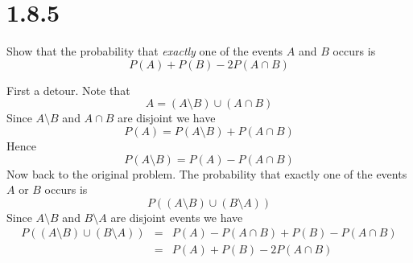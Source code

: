 \section*{1.8.5}
Show that the probability that {\it exactly} one of the events
$A$ and $B$ occurs is
$$P(A)+P(B)-2P(A\cap B)$$

\bigskip
\noindent
First a detour. Note that
$$A=(A\setminus B)\cup(A\cap B)$$
Since $A\setminus B$ and $A\cap B$ are disjoint we have
$$P(A)=P(A\setminus B)+P(A\cap B)$$
Hence
$$P(A\setminus B)=P(A)-P(A\cap B)$$
Now back to the original problem.
The probability that exactly one of the events $A$ or $B$ occurs is
$$P((A\setminus B)\cup(B\setminus A))$$
Since $A\setminus B$ and $B\setminus A$ are disjoint events we have
\begin{eqnarray*}
P((A\setminus B)\cup(B\setminus A))&=&
P(A)-P(A\cap B)+P(B)-P(A\cap B)\\
&=&P(A)+P(B)-2P(A\cap B)
\end{eqnarray*}
